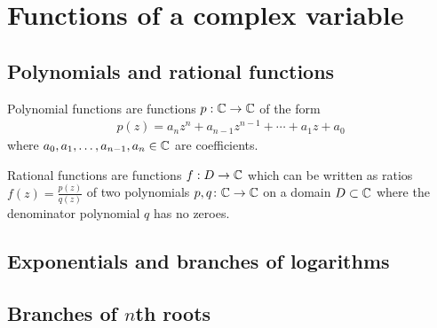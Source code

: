 


\section{Functions of a complex variable}

\subsection{Polynomials and rational functions}

\begin{definition}[Polynomial]
  \label{def:polynomial}
  Polynomial functions are functions $p : \mathbb{C} \to \mathbb{C}$ of the form
  \begin{align*}
    p(z) = a_n z^n + a_{n-1} z^{n-1} + \cdots + a_1 z + a_0
  \end{align*}
  where $a_0,a_1,\ldots,a_{n-1},a_n \in \mathbb{C}$ are coefficients.
\end{definition}

\begin{definition}
  \label{def:rational_function}
  Rational functions are functions $f : D \to \mathbb{C}$ which can be written as
  ratios $f(z) = \frac{p(z)}{q(z)}$ of two polynomials
  $p, q \colon \mathbb{C} \to \mathbb{C}$ on a domain $D \subset \mathbb{C}$
  where the denominator polynomial $q$ has no zeroes.
\end{definition}



\subsection{Exponentials and branches of logarithms}



\subsection{Branches of $n$th roots}
